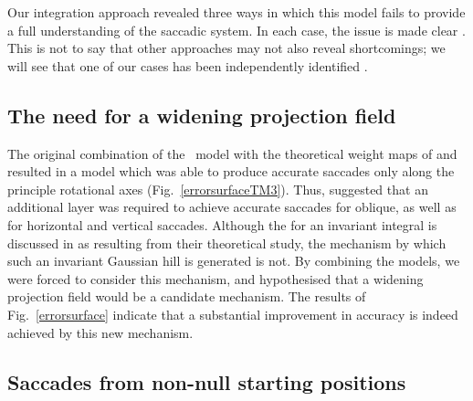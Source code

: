 Our integration approach revealed three ways in which this model fails
to provide a full understanding of the saccadic system. In each case,
the issue is made clear . This is not
to say that other approaches may not also reveal shortcomings; we will
see that one of our cases has been independently identified
\citep{groh_effects_2011}.

\subsection{The need for a widening projection field}

The original combination of the \ccg~model with the theoretical weight
maps of \cite{ottes_visuomotor_1986} and \cite{tabareau_geometry_2007}
resulted in a model which was
able to produce accurate saccades only along the principle rotational
axes (Fig.~\ref{errorsurfaceTM3}). Thus,  suggested that an additional
layer was required to achieve accurate saccades for oblique, as well
as for horizontal and vertical saccades. Although the  for an
invariant integral is discussed in \cite{tabareau_geometry_2007} as resulting from
their theoretical study, the mechanism by which such an invariant
Gaussian hill is generated is not. By combining the models, we were
forced to consider this mechanism, and hypothesised that a widening
projection field would be a candidate mechanism. The results of
Fig.~\ref{errorsurface} indicate that a substantial improvement
in accuracy is indeed achieved by this new mechanism.

\subsection{Saccades from non-null starting positions}

